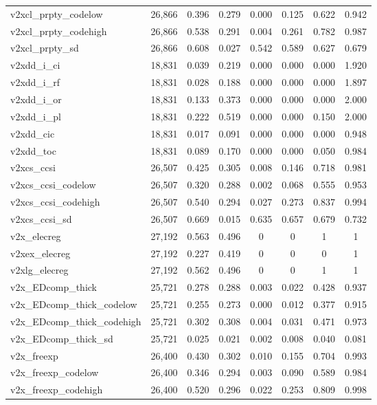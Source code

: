 \begin{table}[!htbp]
\begin{tabular}{@{\extracolsep{5pt}}lccccccc}
v2xcl\_prpty\_codelow & 26,866 & 0.396 & 0.279 & 0.000 & 0.125 & 0.622 & 0.942 \\ 
v2xcl\_prpty\_codehigh & 26,866 & 0.538 & 0.291 & 0.004 & 0.261 & 0.782 & 0.987 \\ 
v2xcl\_prpty\_sd & 26,866 & 0.608 & 0.027 & 0.542 & 0.589 & 0.627 & 0.679 \\ 
v2xdd\_i\_ci & 18,831 & 0.039 & 0.219 & 0.000 & 0.000 & 0.000 & 1.920 \\ 
v2xdd\_i\_rf & 18,831 & 0.028 & 0.188 & 0.000 & 0.000 & 0.000 & 1.897 \\ 
v2xdd\_i\_or & 18,831 & 0.133 & 0.373 & 0.000 & 0.000 & 0.000 & 2.000 \\ 
v2xdd\_i\_pl & 18,831 & 0.222 & 0.519 & 0.000 & 0.000 & 0.150 & 2.000 \\ 
v2xdd\_cic & 18,831 & 0.017 & 0.091 & 0.000 & 0.000 & 0.000 & 0.948 \\ 
v2xdd\_toc & 18,831 & 0.089 & 0.170 & 0.000 & 0.000 & 0.050 & 0.984 \\ 
v2xcs\_ccsi & 26,507 & 0.425 & 0.305 & 0.008 & 0.146 & 0.718 & 0.981 \\ 
v2xcs\_ccsi\_codelow & 26,507 & 0.320 & 0.288 & 0.002 & 0.068 & 0.555 & 0.953 \\ 
v2xcs\_ccsi\_codehigh & 26,507 & 0.540 & 0.294 & 0.027 & 0.273 & 0.837 & 0.994 \\ 
v2xcs\_ccsi\_sd & 26,507 & 0.669 & 0.015 & 0.635 & 0.657 & 0.679 & 0.732 \\ 
v2x\_elecreg & 27,192 & 0.563 & 0.496 & 0 & 0 & 1 & 1 \\ 
v2xex\_elecreg & 27,192 & 0.227 & 0.419 & 0 & 0 & 0 & 1 \\ 
v2xlg\_elecreg & 27,192 & 0.562 & 0.496 & 0 & 0 & 1 & 1 \\ 
v2x\_EDcomp\_thick & 25,721 & 0.278 & 0.288 & 0.003 & 0.022 & 0.428 & 0.937 \\ 
v2x\_EDcomp\_thick\_codelow & 25,721 & 0.255 & 0.273 & 0.000 & 0.012 & 0.377 & 0.915 \\ 
v2x\_EDcomp\_thick\_codehigh & 25,721 & 0.302 & 0.308 & 0.004 & 0.031 & 0.471 & 0.973 \\ 
v2x\_EDcomp\_thick\_sd & 25,721 & 0.025 & 0.021 & 0.002 & 0.008 & 0.040 & 0.081 \\ 
v2x\_freexp & 26,400 & 0.430 & 0.302 & 0.010 & 0.155 & 0.704 & 0.993 \\ 
v2x\_freexp\_codelow & 26,400 & 0.346 & 0.294 & 0.003 & 0.090 & 0.589 & 0.984 \\ 
v2x\_freexp\_codehigh & 26,400 & 0.520 & 0.296 & 0.022 & 0.253 & 0.809 & 0.998 \\ 

\end{tabular}
\end{table}
